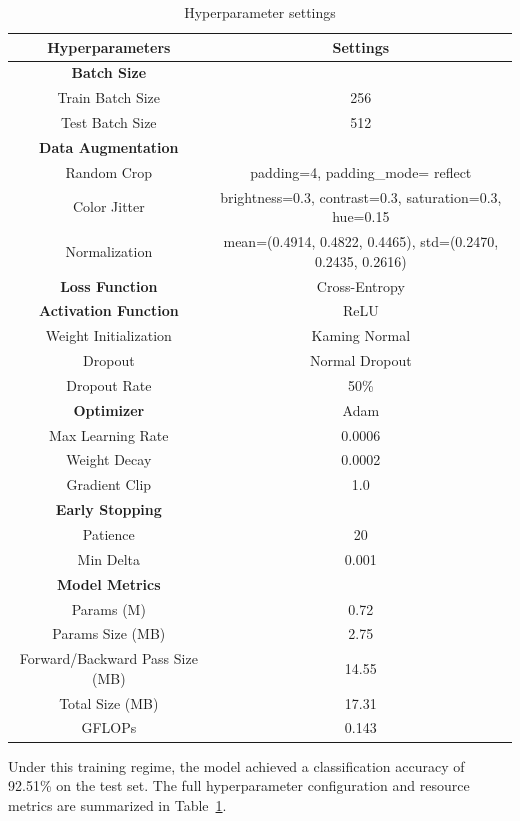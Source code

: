 \documentclass{article}
\begin{document}
\begin{table}[H]
  \centering
  \caption{Hyperparameter settings}
  \label{tab:model_setting}
  \begin{tabular}{cc}
    \toprule
    \textbf{Hyperparameters} & \textbf{Settings} \\
    \midrule
    \textbf{Batch Size} &\\
    Train Batch Size & 256\\
    Test Batch Size & 512\\
    \midrule
    \textbf{Data Augmentation} &\\
    Random Crop & padding=4, padding\_mode= reflect \\
    Color Jitter & brightness=0.3, contrast=0.3, saturation=0.3, hue=0.15 \\
    Normalization & mean=(0.4914, 0.4822, 0.4465), std=(0.2470, 0.2435, 0.2616)\\
    \midrule
    \textbf{Loss Function} & Cross-Entropy \\
    \midrule
    \textbf{Activation Function} & ReLU\\
    Weight Initialization & Kaming Normal\\
    Dropout & Normal Dropout \\
    Dropout Rate & 50\%\\
    \midrule
    \textbf{Optimizer} & Adam \\
    Max Learning Rate & 0.0006\\
    Weight Decay & 0.0002\\
    Gradient Clip & 1.0\\
    \midrule
    \textbf{Early Stopping} &\\
    Patience & 20 \\
    Min Delta & 0.001\\
    \midrule
    \textbf{Model Metrics}\\
    Params (M) & 0.72\\
    Params Size (MB) & 2.75\\
    Forward/Backward Pass Size (MB) & 14.55\\
    Total Size (MB) & 17.31\\
    GFLOPs & 0.143\\
    \bottomrule
  \end{tabular}
\end{table}

 Under this training regime, the model achieved a classification accuracy of 92.51\% on the test set. The full hyperparameter configuration and resource metrics are summarized in Table \ref{tab:model_setting}.
\end{document}
